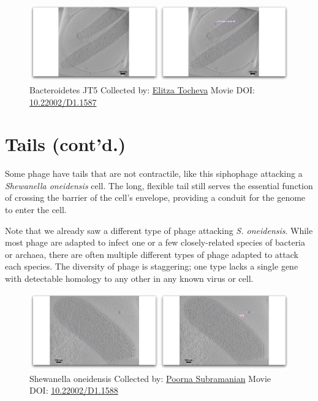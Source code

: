 \documentclass[]{tufte-book}
\begin{document}
\begin{figure}
\includegraphics{movie_stills/10_2} \caption[Bacteroidetes JT5 Collected by:
\protect\hyperlink{elitza_tocheva}{Elitza Tocheva} Movie DOI:
\href{https://doi.org/10.22002/D1.1587}{10.22002/D1.1587}]{Bacteroidetes JT5 Collected by:
\protect\hyperlink{elitza_tocheva}{Elitza Tocheva} Movie DOI:
\href{https://doi.org/10.22002/D1.1587}{10.22002/D1.1587}}\label{fig:10-2}
\end{figure}

\section{Tails (cont'd.)}\label{tails-contd.}

Some phage have tails that are not contractile, like this siphophage
attacking a \emph{Shewanella oneidensis} cell. The long, flexible tail
still serves the essential function of crossing the barrier of the
cell's envelope, providing a conduit for the genome to enter the cell.

Note that we already saw a different type of phage attacking \emph{S.
oneidensis}. While most phage are adapted to infect one or a few
closely-related species of bacteria or archaea, there are often multiple
different types of phage adapted to attack each species. The diversity
of phage is staggering; one type lacks a single gene with detectable
homology to any other in any known virus or cell.





\begin{figure}
\includegraphics{movie_stills/10_3} \caption[Shewanella oneidensis Collected by:
\protect\hyperlink{poorna_subramanian}{Poorna Subramanian} Movie DOI:
\href{https://doi.org/10.22002/D1.1588}{10.22002/D1.1588}]{Shewanella oneidensis Collected by:
\protect\hyperlink{poorna_subramanian}{Poorna Subramanian} Movie DOI:
\href{https://doi.org/10.22002/D1.1588}{10.22002/D1.1588}}\label{fig:10-3}
\end{figure}
\end{document}
